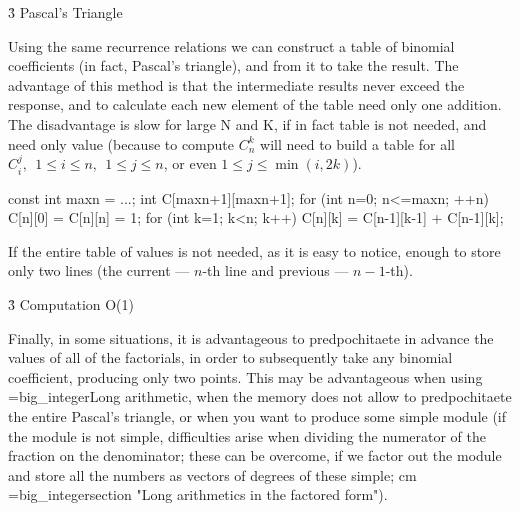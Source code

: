 \h3{ Pascal's Triangle }

Using the same recurrence relations we can construct a table of binomial coefficients (in fact, Pascal's triangle), and from it to take the result. The advantage of this method is that the intermediate results never exceed the response, and to calculate each new element of the table need only one addition. The disadvantage is slow for large N and K, if in fact table is not needed, and need only value (because to compute $C_n^k$ will need to build a table for all $C_i^j,\ \ 1 \le i \le n,\ \ 1 \le j \le n$, or even $1 \le j \le \min(i,2k)$).

\code

const int maxn = ...;
int C[maxn+1][maxn+1];
for (int n=0; n<=maxn; ++n) {
C[n][0] = C[n][n] = 1;
for (int k=1; k<n; k++)
C[n][k] = C[n-1][k-1] + C[n-1][k];
}
\endcode

If the entire table of values is not needed, as it is easy to notice, enough to store only two lines (the current --- $n$-th line and previous --- $n-1$-th).

\h3{ Computation O(1) }

Finally, in some situations, it is advantageous to predpochitaete in advance the values of all of the factorials, in order to subsequently take any binomial coefficient, producing only two points. This may be advantageous when using \algohref=big_integer{Long arithmetic}, when the memory does not allow to predpochitaete the entire Pascal's triangle, or when you want to produce some simple module (if the module is not simple, difficulties arise when dividing the numerator of the fraction on the denominator; these can be overcome, if we factor out the module and store all the numbers as vectors of degrees of these simple; cm \algohref=big_integer{section "Long arithmetics in the factored form"}).
